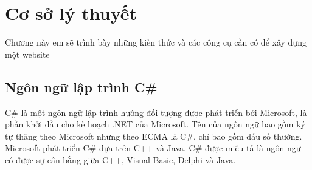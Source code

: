 \chapter{Cơ sở lý thuyết}
\label{chapter2}
Chương này em sẽ trình bày những kiến thức và các công cụ cần có để xây dựng một website
\section{Ngôn ngữ lập trình C\# } \label{ngonngu} 
C\# là một ngôn ngữ lập trình hướng đối tượng được phát triển bởi Microsoft, là phần khởi đầu cho kế hoạch .NET của Microsoft. Tên của ngôn ngữ bao gồm ký tự thăng theo Microsoft nhưng theo ECMA là C\#, chỉ bao gồm dấu số thường. Microsoft phát triển C\# dựa trên C++ và Java. C\# được miêu tả là ngôn ngữ có được sự cân bằng giữa C++, Visual Basic, Delphi và Java.

